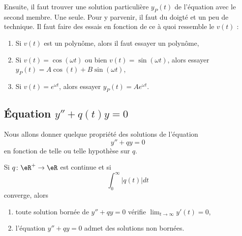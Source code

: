 Ensuite, il faut trouver une solution particulière $y_P(t)$ de l'équation avec le second membre. Une seule. Pour y parvenir, il faut du doigté et un peu de technique. Il faut faire des essais en fonction de ce à quoi ressemble le $v(t)$ :
\begin{enumerate}

	\item
		Si $v(t)$ est un polynôme, alors il faut essayer un polynôme,

	\item
		Si $v(t)=\cos(\omega t)$ ou bien $v(t)=\sin(\omega t)$, alors essayer $y_P(t)=A\cos(t)+B\sin(\omega t)$,

	\item
		Si $v(t)= e^{\omega t}$, alors essayer $y_P(t)=A e^{\omega t}$.

\end{enumerate}

\subsection{Équation \texorpdfstring{$y''+q(t)y=0$}{y''+q(t)y=0}}
\label{subsecSyTwyM}


Nous allons donner quelque propriété des solutions de l'équation
\begin{equation}
    y''+qy=0
\end{equation}
en fonction de telle ou telle hypothèse sur \( q\).

\begin{proposition}
    Si \( q\colon \eR^+\to \eR\) est continue et si
    \begin{equation}
        \int_0^{\infty}| q(t) |dt
    \end{equation}
    converge, alors
    \begin{enumerate}
        \item
            toute solution bornée de \( y''+qy=0\) vérifie \( \lim_{t\to \infty} y'(t)=0\),
        \item
            l'équation \( y''+qy=0\) admet des solutions non bornées.
    \end{enumerate}
\end{proposition}

